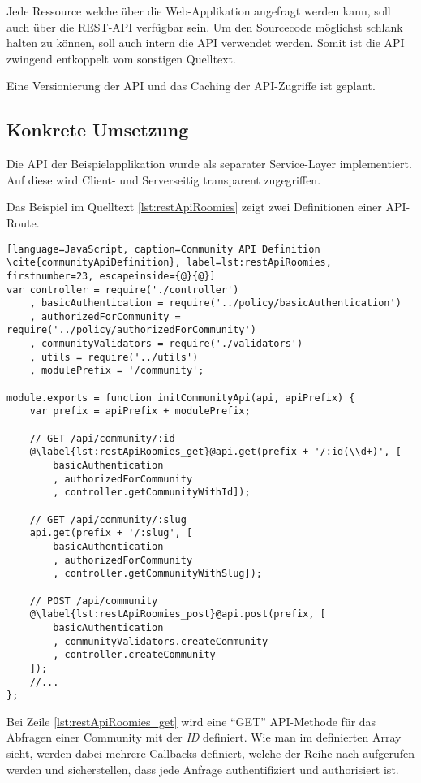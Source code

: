 Jede Ressource welche über die Web-Applikation angefragt werden kann, soll auch über die REST-API verfügbar sein. Um den Sourcecode möglichst schlank halten zu können, soll auch intern die API verwendet werden.
Somit ist die API zwingend entkoppelt vom sonstigen Quelltext.

Eine Versionierung der API und das Caching der API-Zugriffe ist geplant.

\subsection*{Konkrete Umsetzung}
\label{sec:principle-rp1-rest-concrete-solution}
Die API der Beispielapplikation wurde als separater Service-Layer implementiert. Auf diese wird Client- und Serverseitig transparent zugegriffen.

Das Beispiel im Quelltext \ref{lst:restApiRoomies} zeigt zwei Definitionen einer API-Route.

\begin{lstlisting}[language=JavaScript, caption=Community API Definition \cite{communityApiDefinition}, label=lst:restApiRoomies, firstnumber=23, escapeinside={@}{@}]
var controller = require('./controller')
	, basicAuthentication = require('../policy/basicAuthentication')
	, authorizedForCommunity = require('../policy/authorizedForCommunity')
	, communityValidators = require('./validators')
	, utils = require('../utils')
	, modulePrefix = '/community';

module.exports = function initCommunityApi(api, apiPrefix) {
	var prefix = apiPrefix + modulePrefix;

	// GET /api/community/:id
	@\label{lst:restApiRoomies_get}@api.get(prefix + '/:id(\\d+)', [
		basicAuthentication
		, authorizedForCommunity
		, controller.getCommunityWithId]);

	// GET /api/community/:slug
	api.get(prefix + '/:slug', [
		basicAuthentication
		, authorizedForCommunity
		, controller.getCommunityWithSlug]);

	// POST /api/community
	@\label{lst:restApiRoomies_post}@api.post(prefix, [
		basicAuthentication
		, communityValidators.createCommunity
		, controller.createCommunity
	]);
	//...
};
\end{lstlisting}

Bei Zeile \autoref{lst:restApiRoomies_get} wird eine ``GET'' API-Methode für das Abfragen einer Community mit der \emph{ID} definiert. Wie man im definierten Array sieht, werden dabei mehrere Callbacks definiert, welche der Reihe nach aufgerufen werden und sicherstellen, dass jede Anfrage authentifiziert und authorisiert ist.

